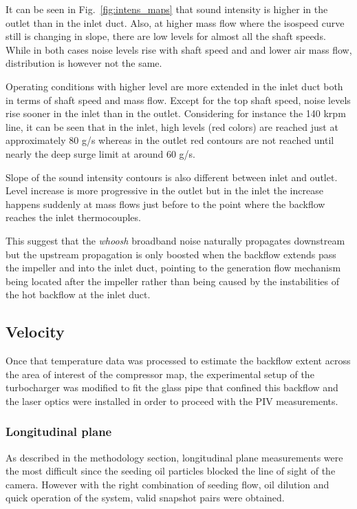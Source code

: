It can be seen in Fig.~\ref{fig:intens_maps} that sound intensity is higher in the outlet than in the inlet duct. Also, at higher mass flow where the isospeed curve still is changing in slope, there are low levels for almost all the shaft speeds. While in both cases noise levels rise with shaft speed and and lower air mass flow, distribution is however not the same.

Operating conditions with higher level are more extended in the inlet duct both in terms of shaft speed and mass flow. Except for the top shaft speed, noise levels rise sooner in the inlet than in the outlet. Considering for instance the 140 krpm line, it can be seen that in the inlet, high levels (red colors) are reached just at approximately 80 g/s whereas in the outlet red contours are not reached until nearly the deep surge limit at around 60 g/s.

Slope of the sound intensity contours is also different between inlet and outlet. Level increase is more progressive in the outlet but in the inlet the increase happens suddenly at mass flows just before to the point where the backflow reaches the inlet thermocouples.

This suggest that the \emph{whoosh} broadband noise naturally propagates downstream but the upstream propagation is only boosted when the backflow extends pass the impeller and into the inlet duct, pointing to the generation flow mechanism being located after the impeller rather than being caused by the instabilities of the hot backflow at the inlet duct.

\subsection{Velocity}
\label{sub:velocity}

Once that temperature data was processed to estimate the backflow extent across the area of interest of the compressor map, the experimental setup of the turbocharger was modified to fit the glass pipe that confined this backflow and the laser optics were installed in order to proceed with the PIV measurements.

\subsubsection{Longitudinal plane}

As described in the methodology section, longitudinal plane measurements were the most difficult since the seeding oil particles blocked the line of sight of the camera. However with the right combination of seeding flow, oil dilution and quick operation of the system, valid snapshot pairs were obtained.

